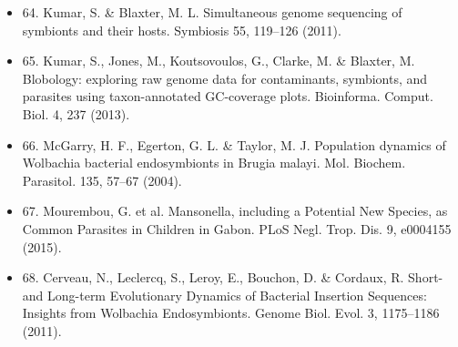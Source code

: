 \documentclass[10pt, a4paper, twocolumn]{article} %
\begin{document}
\begin{itemize}
\item 64.	Kumar, S. \& Blaxter, M. L. Simultaneous genome sequencing of symbionts and their hosts. Symbiosis 55, 119–126 (2011).
\item 65.	Kumar, S., Jones, M., Koutsovoulos, G., Clarke, M. \& Blaxter, M. Blobology: exploring raw genome data for contaminants, symbionts, and parasites using taxon-annotated GC-coverage plots. Bioinforma. Comput. Biol. 4, 237 (2013).
\item 66.	McGarry, H. F., Egerton, G. L. \& Taylor, M. J. Population dynamics of Wolbachia bacterial endosymbionts in Brugia malayi. Mol. Biochem. Parasitol. 135, 57–67 (2004).
\item 67.	Mourembou, G. et al. Mansonella, including a Potential New Species, as Common Parasites in Children in Gabon. PLoS Negl. Trop. Dis. 9, e0004155 (2015).
\item 68.	Cerveau, N., Leclercq, S., Leroy, E., Bouchon, D. \& Cordaux, R. Short- and Long-term Evolutionary Dynamics of Bacterial Insertion Sequences: Insights from Wolbachia Endosymbionts. Genome Biol. Evol. 3, 1175–1186 (2011).

\end{itemize}


\printbibliography[title={Bibliography}] %

\end{document}
